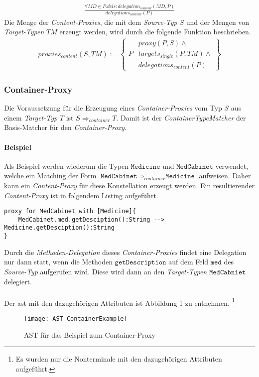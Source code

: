 \begin{gather*}
\frac{\mathit{\forall \mathit{MD} \in P.dels: \mathit{delegation_{content}(MD,P)}}}
{\mathit{delegations_{content}(P)}}
\end{gather*}
\noindent
Die Menge der \emph{Content-Proxies}, die mit dem \emph{Source-Typ} $S$ und der Mengen von \emph{Target-Typen} $\mathit{TM}$ erzeugt werden, wird durch die folgende Funktion beschrieben.
\begin{gather*}
\mathit{proxies_{content}(S,\mathit{TM})} := 
\left\{\begin{array}{l|l}
		& \mathit{proxy(P,S)} \wedge \mathit{ } \\
	P	& \mathit{targets_{single}(P,\mathit{TM})} \wedge \mathit{ }\\
		& \mathit{delegations_{content}(P)} 
		 \end{array}
\right\}
\end{gather*}
\subsubsection{Container-Proxy}
Die Voraussetzung für die Erzeugung eines \emph{Container-Proxies} vom Typ $S$ aus einem \emph{Target-Typ} $T$ ist $S \Rightarrow_{container} T$. Damit ist der \emph{ContainerTypeMatcher} der Basis-Matcher für den \emph{Container-Proxy}.
\paragraph{Beispiel}
Als Beispiel werden wiederum die Typen $\texttt{Medicine}$ und $\texttt{MedCabinet}$ verwendet, welche ein Matching der Form $\texttt{MedCabinet} \Rightarrow_{container} \texttt{Medicine}$ aufweisen. Daher kann ein \emph{Content-Proxy} für diese Konstellation erzeugt werden. Ein resultierender \emph{Content-Proxy} ist in folgendem Listing aufgeführt.
\begin{lstlisting}[style = dsl, caption = Container-Proxy für MedCabniet, captionpos = b ]
proxy for MedCabinet with [Medicine]{
	MedCabinet.med.getDesciption():String --> Medicine.getDesciption():String
}
\end{lstlisting}
Durch die \emph{Methoden-Delegation} dieses \emph{Container-Proxies} findet eine Delegation nur dann statt, wenn die Methoden $\texttt{getDescription}$ auf dem Feld $\texttt{med}$ des \emph{Source-Typ} aufgerufen wird. Diese wird dann an den \emph{Target-Typen} $\texttt{MedCabniet}$ delegiert.
\\\\
Der \acrshort{ast} mit den dazugehörigen Attributen ist Abbildung \ref{fig:ASTCONTAINER} zu entnehmen. \footnote{Es wurden nur die Nonterminale mit den dazugehörigen Attributen aufgeführt.}
\begin{figure}[h!]
\centering
\texttt{[image: AST\_ContainerExample]}
\caption{AST für das Beispiel zum Container-Proxy}
\label{fig:ASTCONTAINER}
\end{figure}
\noindent
